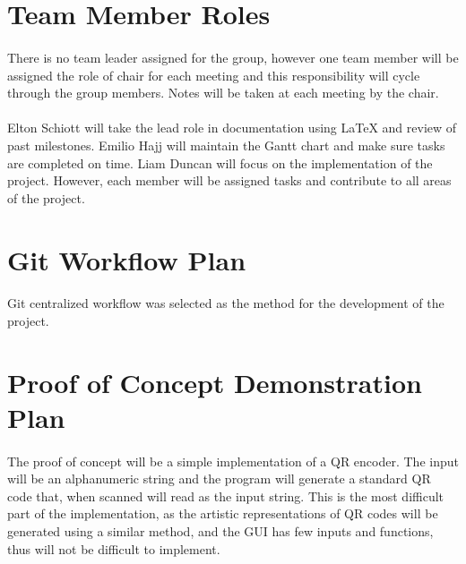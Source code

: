 \documentclass{article}
\begin{document}
\section{Team Member Roles}

	\paragraph{}
	
		There is no team leader assigned for the group, however one team member 
		will be assigned the role of chair for each meeting and this 
		responsibility will cycle through the group members. Notes will be 
		taken at each meeting by the chair.
		
	\paragraph{}
		
		Elton Schiott will take the lead role in documentation using LaTeX and 
		review of past milestones. Emilio Hajj will maintain the Gantt chart 
		and make sure tasks are completed on time. Liam Duncan will focus on 
		the implementation of the project. However, each member will be 
		assigned tasks and contribute to all areas of the project.
		
\section{Git Workflow Plan}

	\paragraph{}
		
		Git centralized workflow was selected as the method for the development 
		of the project.
		
\section{Proof of Concept Demonstration Plan}

	\paragraph{}
		
		The proof of concept will be a simple implementation of a QR encoder. 
		The input will be an alphanumeric string and the program will generate 
		a standard QR code that, when scanned will read as the input string. 
		This is the most difficult part of the implementation, as the artistic 
		representations of QR codes will be generated using a similar method, 
		and the GUI has few inputs and functions, thus will not be difficult to 
		implement. 
		
\end{document}
